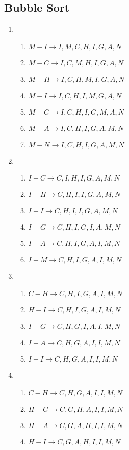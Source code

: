 \documentclass[a4paper,12pt,titlepage]{article}
\begin{document}
\subsection*{Bubble Sort}
\begin{enumerate}
\item 
\begin{enumerate}
\item $M-I\rightarrow I,M,C,H,I,G,A,N$
\item $M-C\rightarrow I,C,M,H,I,G,A,N$
\item $M-H\rightarrow I,C,H,M,I,G,A,N$
\item $M-I\rightarrow I,C,H,I,M,G,A,N$
\item $M-G\rightarrow I,C,H,I,G,M,A,N$
\item $M-A\rightarrow I,C,H,I,G,A,M,N$
\item $M-N\rightarrow I,C,H,I,G,A,M,N$
\end{enumerate}
\item 
\begin{enumerate}
\item $I-C\rightarrow C,I,H,I,G,A,M,N$
\item $I-H\rightarrow C,H,I,I,G,A,M,N$
\item $I-I\rightarrow C,H,I,I,G,A,M,N$
\item $I-G\rightarrow C,H,I,G,I,A,M,N$
\item $I-A\rightarrow C,H,I,G,A,I,M,N$
\item $I-M\rightarrow C,H,I,G,A,I,M,N$
\end{enumerate}
\item 
\begin{enumerate}
\item $C-H\rightarrow C,H,I,G,A,I,M,N$
\item $H-I\rightarrow C,H,I,G,A,I,M,N$
\item $I-G\rightarrow C,H,G,I,A,I,M,N$
\item $I-A\rightarrow C,H,G,A,I,I,M,N$
\item $I-I\rightarrow C,H,G,A,I,I,M,N$
\end{enumerate}
\item 
\begin{enumerate}
\item $C-H\rightarrow C,H,G,A,I,I,M,N$
\item $H-G\rightarrow C,G,H,A,I,I,M,N$
\item $H-A\rightarrow C,G,A,H,I,I,M,N$
\item $H-I\rightarrow C,G,A,H,I,I,M,N$
\end{enumerate}

\end{enumerate}
\end{document}

